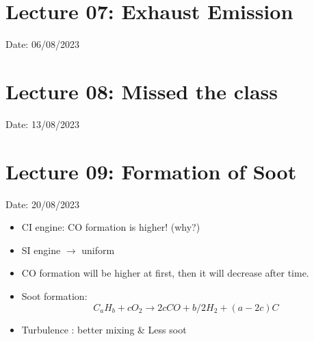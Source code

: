 \documentclass{article}
\begin{document}
	\begin{center}
	\end{center}
	\vspace*{2cm}

	\section{Lecture 07: Exhaust Emission} 
	\hfill Date: 06/08/2023

	\begin{center}
	\end{center}

	\section{Lecture 08: Missed the class} 
	\hfill Date: 13/08/2023

	\section{Lecture 09: Formation of Soot} 
	\hfill Date: 20/08/2023
	
	\begin{itemize}
		\item CI engine: CO formation is higher! (why?)
		\item SI engine $\rightarrow$ uniform  
		\item CO formation will be higher at first, then it will decrease after time.
		\item Soot formation: $$C_aH_b + cO_2 \rightarrow 2cCO + b/2 H_2 + (a - 2c) C$$
		\item Turbulence : better mixing \& Less soot 
	\end{itemize}

	\begin{center}
	\end{center}
\end{document}
